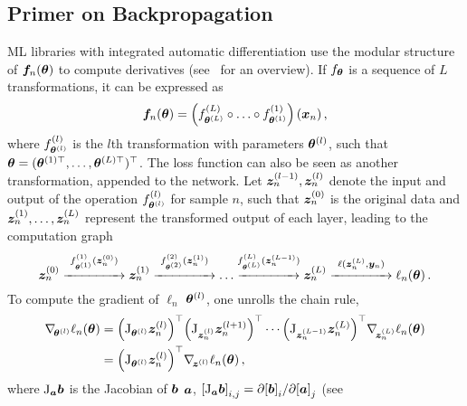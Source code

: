 \subsection{Primer on Backpropagation}

ML libraries with integrated automatic differentiation use the
modular structure of ${\bm{f}}_n({\bm{\theta}})$ to compute derivatives
(see~\cite{baydin2018automatic} for an overview). If $f_{{\bm{\theta}}}$ is a sequence
of $L$ transformations, it can be expressed as
\begin{equation}
  {\bm{f}}_n({\bm{\theta}})
  =
  \left(
    f^{(L)}_{{\bm{\theta}}^{(L)}} \circ \ldots \circ f^{(1)}_{{\bm{\theta}}^{(1)}}
  \right)({\bm{x}}_n)\,{,}
\end{equation}
where $f^{(l)}_{{\bm{\theta}}^{(l)}}$ is the $l$th transformation with parameters
${\bm{\theta}}^{(l)}$, such that ${\bm{\theta}} = ( {\bm{\theta}}^{(1)\top}, \ldots, {\bm{\theta}}^{(L)\top} )^{\top}$.
The loss function can also be seen as another transformation, appended to the
network. Let ${\bm{z}}_n^{(l-1)}, {\bm{z}}_n^{(l)}$ denote the input and output of the
operation $f^{(l)}_{{\bm{\theta}}^{(l)}}$ for sample $n$, such that ${\bm{z}}_n^{(0)}$ is
the original data and ${\bm{z}}_n^{(1)}, \ldots, {\bm{z}}_n^{(L)}$
represent the transformed output of each layer, leading to the computation graph\\[-.5em]
\[
  \textstyle {\bm{z}}_n^{(0)}
  \stackrel{f^{(1)}_{{\bm{\theta}}^{(1)}}({\bm{z}}_n^{(0)})}{\xrightarrow{\hspace*{1.5cm}}}
  {\bm{z}}_n^{(1)}
  \stackrel{f^{(2)}_{{\bm{\theta}}^{(2)}}({\bm{z}}_n^{(1)})}{\xrightarrow{\hspace*{1.5cm}}} \ldots
  \stackrel{f^{(L)}_{{\bm{\theta}}^{(L)}}({\bm{z}}_n^{(L-1)})}{\xrightarrow{\hspace*{1.5cm}}}
  {\bm{z}}_n^{(L)} \stackrel{\ell({\bm{z}}_n^{(L)}, {\bm{y}}_n)}{\xrightarrow{\hspace*{1.5cm}}}
  \ell_n({\bm{\theta}})\,{.}
\]
To compute the gradient of $\ell_n$ \wrt ${\bm{\theta}}^{(l)}$, one unrolls the chain rule,
\begin{equation}
  \begin{split}
    \nabla_{\!{{\bm{\theta}}^{(l)}}} \ell_n({\bm{\theta}})
    &=
      {\left(\mathrm{J}_{{\bm{\theta}}^{(l)}}
      {\bm{z}}_n^{(l)}\right)}^\top
      {\left(\mathrm{J}_{{\bm{z}}_n^{(l)}} {\bm{z}}_n^{(l+1)}\right)}^\top
      \cdots
      {\left(\mathrm{J}_{{\bm{z}}_n^{(L-1)}} {\bm{z}}_n^{(L)}\right)}^\top
      \nabla_{\!{{\bm{z}}_n^{(L)}}}\ell_n({\bm{\theta}})
    \\
    &=
      {\left(\mathrm{J}_{{\bm{\theta}}^{(l)}} {\bm{z}}_n^{(l)}\right)}^\top
      \nabla_{\!{{\bm{z}}^{(l)}}}\ell_n({\bm{\theta}})\,{,}
  \end{split}\label{backpack::eq:backprop_gradient}
\end{equation}
where $\mathrm{J}_{{\bm{a}}} {\bm{b}}$ is the Jacobian of ${\bm{b}}$ \wrt ${\bm{a}}$, ${[\mathrm{J}_{{\bm{a}}}
  {\bm{b}}]}_{i,j} = \partial {[{\bm{b}}]}_i / \partial {[{\bm{a}}]}_j$ (see
